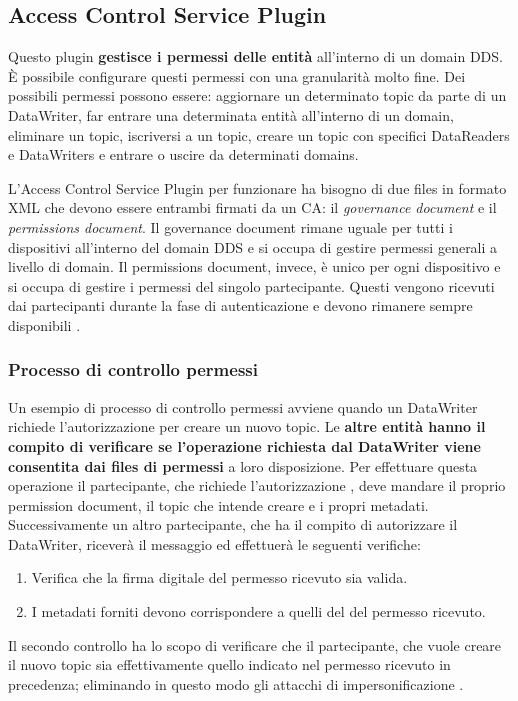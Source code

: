 \subsection{Access Control Service Plugin}

Questo plugin \textbf{gestisce i permessi delle entità} all'interno di 
un domain DDS. È possibile configurare questi permessi con una 
granularità molto fine. Dei possibili permessi possono essere:
aggiornare un determinato topic da parte di 
un DataWriter, far entrare una determinata entità
all'interno di un domain, eliminare un topic, iscriversi a un topic, 
creare un topic con specifici DataReaders e DataWriters e
entrare o uscire da determinati domains.

L'Access Control Service Plugin per funzionare ha bisogno di due 
files in formato XML che devono essere entrambi firmati da 
un CA: il \textit{governance document} e il \textit{permissions document}.
Il governance document rimane uguale per tutti i dispositivi 
all'interno del domain DDS e si occupa di gestire 
permessi generali a livello di domain. Il permissions document,
invece, è unico per ogni dispositivo e si occupa di gestire i 
permessi del singolo partecipante.
Questi vengono ricevuti dai partecipanti durante la fase di
autenticazione e devono rimanere sempre disponibili \cite{essay93639}.

\subsubsection{Processo di controllo permessi}
Un esempio di processo di controllo permessi avviene
quando un DataWriter richiede l'autorizzazione per creare un nuovo topic.
Le \textbf{altre entità hanno il compito di verificare se l'operazione 
richiesta dal DataWriter viene consentita
dai files di permessi} a loro disposizione. Per effettuare 
questa operazione il partecipante, che richiede l'autorizzazione ,
deve mandare il proprio permission document, il topic che intende creare e 
i propri metadati. Successivamente un altro partecipante,
che ha il compito di autorizzare il DataWriter,
riceverà il messaggio ed effettuerà le seguenti
verifiche:
\begin{enumerate}
    \item Verifica che la firma digitale del permesso ricevuto sia valida.
    \item I metadati forniti devono corrispondere a quelli del del 
    permesso ricevuto.
\end{enumerate}
Il secondo controllo ha lo scopo di verificare
che il partecipante, che vuole creare il 
nuovo topic sia effettivamente quello indicato nel permesso 
ricevuto in precedenza; eliminando in questo modo gli attacchi di 
impersonificazione 
\cite{DBLP:conf/asiaccs/WangLG24}.


